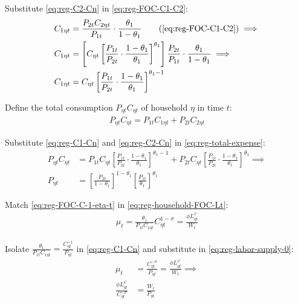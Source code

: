 \documentclass[
	thesis.tex
	]{subfiles}
\begin{document}
Substitute \ref{eq:reg-C2-Cn} in \ref{eq:reg-FOC-C1-C2}:
\begin{align}
	C_{1\eta t} &= \frac{P_{2t} C_{2\eta t}}{P_{1t}} \cdot \frac{\theta_1}{1 -\theta_1} \tag{\ref{eq:reg-FOC-C1-C2}} \implies \nonumber \\
	C_{1\eta t} &= \left[ C_{\eta t} \left[ \frac{P_{1t} }{P_{2t}} \cdot \frac{1 -\theta_1}{\theta_1} \right]^{\theta_1} \right] \frac{P_{2t}}{P_{1t}} \cdot \frac{\theta_1}{1 -\theta_1} \implies \nonumber \\
	C_{1\eta t} &= C_{\eta t} \left[ \frac{P_{1t} }{P_{2t}} \cdot \frac{1 -\theta_1}{\theta_1} \right]^{\theta_1 -1} \label{eq:reg-C1-Cn}
\end{align}

Define the total consumption $P_{\eta t} C_{\eta t}$ of household $\eta$ in time $t$:
\begin{align}
	P_{\eta t} C_{\eta t} = P_{1 t} C_{1\eta t} + P_{2 t} C_{2\eta t} \label{eq:reg-total-expense}
\end{align}

Substitute \ref{eq:reg-C1-Cn} and \ref{eq:reg-C2-Cn} in \ref{eq:reg-total-expense}:
\begin{align}
	P_{\eta t} C_{\eta t} &= P_{1 t} C_{\eta t} \left[ \frac{P_{1t} }{P_{2t}} \cdot \frac{1 -\theta_1}{\theta_1} \right]^{\theta_1 -1} + P_{2 t} C_{\eta t} \left[ \frac{P_{1t} }{P_{2t}} \cdot \frac{1 -\theta_1}{\theta_1} \right]^{\theta_1} \implies \nonumber \\
	P_{\eta t} &= \left[ \frac{P_{2t}}{1 -\theta_1} \right]^{1 -\theta_1} \left[ \frac{P_{1t}}{\theta_1} \right]^{\theta_1} \label{eq:reg-price-eta-level}
\end{align}

Match \ref{eq:reg-FOC-C-1-eta-t} in \ref{eq:reg-household-FOC-Lt}:
\begin{align}
	\mu_t = \frac{\theta_1}{P_{1t} C_{1\eta t}} C_{\eta t}^{1 -\sigma} = \frac{\phi L_{\eta t}^{\varphi}}{W_t} \label{eq:reg-labor-supply-0}
\end{align}

Isolate $ \frac{\theta_1}{P_{1t} C_{1\eta t}} = \frac{C_{\eta t}^{-1}}{P_{\eta t}} $ in \ref{eq:reg-C1-Cn} and substitute in \ref{eq:reg-labor-supply-0}:
	\begin{align}
		\mu_t &= \frac{C_{\eta t}^{-\sigma}}{P_{\eta t}} = \frac{\phi L_{\eta t}^{\varphi}}{W_t} \implies \label{eq:reg-FOC-Ct}\\
		\frac{\phi L_{\eta t}^{\varphi}}{C_{\eta t}^{-\sigma}} &= \frac{W_t}{P_{\eta t}} \label{eq:reg-labor-supply}
	\end{align}
\end{document}
